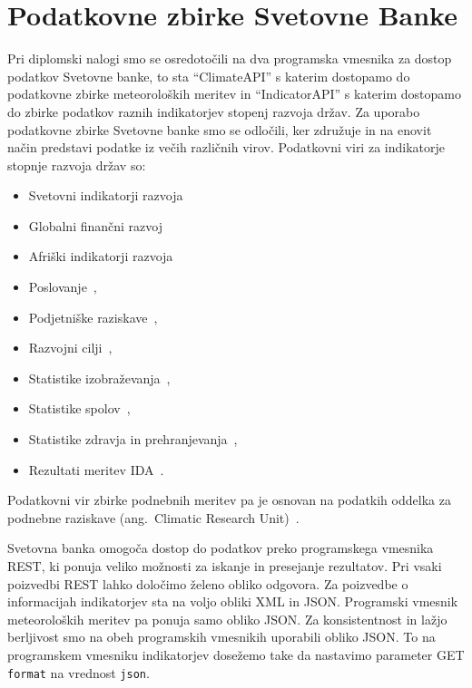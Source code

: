\chapter{Podatkovne zbirke Svetovne Banke}

Pri diplomski nalogi smo se osredotočili na dva programska vmesnika za dostop 
podatkov Svetovne banke, to sta ``ClimateAPI'' s katerim dostopamo do 
podatkovne zbirke meteoroloških meritev in ``IndicatorAPI'' s katerim dostopamo do 
zbirke podatkov raznih indikatorjev stopenj razvoja držav.
Za uporabo podatkovne zbirke Svetovne banke smo se odločili, ker združuje in na
enovit način predstavi podatke iz večih različnih virov. Podatkovni viri za 
indikatorje stopnje razvoja držav so:
\begin{itemize}  
  \item Svetovni indikatorji razvoja~\cite{world_dev_ind} %
  \item Globalni finančni razvoj~\cite{glob_fin_dev}
  \item Afriški indikatorji razvoja~\cite{africa_dev_ind}
  \item Poslovanje~\cite{doing_buseness},
  \item Podjetniške raziskave~\cite{ent_surveys}, 
  \item Razvojni cilji~\cite{mil_dev_goals}, 
  \item Statistike izobraževanja~\cite{edu_stat}, 
  \item Statistike spolov~\cite{gen_stat},
  \item Statistike zdravja in prehranjevanja~\cite{health_pop_stat},
  \item Rezultati meritev IDA~\cite{ida_res_mes_sys}.
\end{itemize}  

Podatkovni vir zbirke podnebnih meritev pa je osnovan na podatkih oddelka
za podnebne raziskave (ang.\ Climatic Research Unit)~\cite{climate_data}.

Svetovna banka omogoča dostop do podatkov preko programskega vmesnika REST, ki
ponuja veliko možnosti za iskanje in presejanje rezultatov. Pri vsaki 
poizvedbi REST lahko določimo želeno obliko odgovora. Za poizvedbe o 
informacijah indikatorjev sta na voljo obliki XML in JSON. Programski vmesnik 
meteoroloških meritev pa ponuja samo obliko JSON. Za konsistentnost in lažjo
berljivost smo na obeh programskih vmesnikih uporabili obliko JSON. To na
programskem vmesniku indikatorjev dosežemo take da nastavimo parameter GET
\verb|format| na vrednost \verb|json|. 


